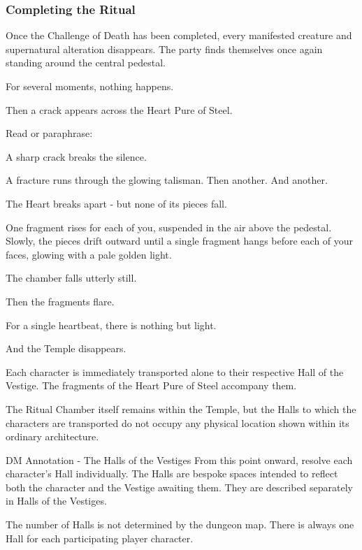 \subsubsection*{Completing the Ritual}
{\entryfont Once the Challenge of Death has been completed, every manifested creature and supernatural alteration disappears. The party finds themselves once again standing around the central pedestal.

For several moments, nothing happens.

Then a crack appears across the Heart Pure of Steel.

Read or paraphrase:}
\begin{DndReadAloud}
	A sharp crack breaks the silence.

	A fracture runs through the glowing talisman. Then another. And another.

	The Heart breaks apart - but none of its pieces fall.

	One fragment rises for each of you, suspended in the air above the pedestal. Slowly, the pieces drift outward until a single fragment hangs before each of your faces, glowing with a pale golden light.

	The chamber falls utterly still.

	Then the fragments flare.

	For a single heartbeat, there is nothing but light.

	And the Temple disappears.
\end{DndReadAloud}
{\noindent\entryfont Each character is immediately transported alone to their respective Hall of the Vestige. The fragments of the Heart Pure of Steel accompany them.

The Ritual Chamber itself remains within the Temple, but the Halls to which the characters are transported do not occupy any physical location shown within its ordinary architecture.}

\begingroup
	\DndSetThemeColor[PhbTan]
	\begin{DndComment}{DM Annotation - The Halls of the Vestiges}
		From this point onward, resolve each character's Hall individually. The Halls are bespoke spaces intended to reflect both the character and the Vestige awaiting them. They are described separately in Halls of the Vestiges.

The number of Halls is not determined by the dungeon map. There is always one Hall for each participating player character.
	\end{DndComment}
\endgroup